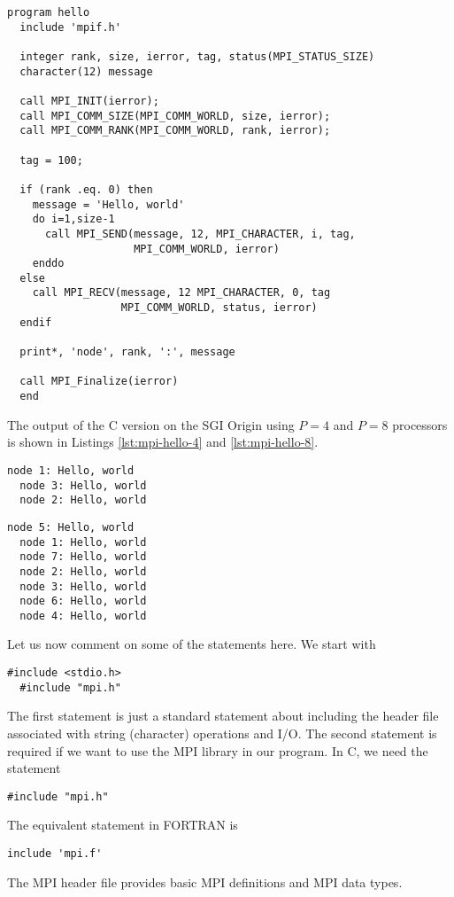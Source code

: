 \begin{lstlisting}[style=fortran, float, caption={Hello world MPI in FORTRAN.}, label=lst:mpi-hello-fortran]
  program hello
  include 'mpif.h'

  integer rank, size, ierror, tag, status(MPI_STATUS_SIZE)
  character(12) message

  call MPI_INIT(ierror);
  call MPI_COMM_SIZE(MPI_COMM_WORLD, size, ierror);
  call MPI_COMM_RANK(MPI_COMM_WORLD, rank, ierror);

  tag = 100;

  if (rank .eq. 0) then
    message = 'Hello, world'
    do i=1,size-1
      call MPI_SEND(message, 12, MPI_CHARACTER, i, tag,
                    MPI_COMM_WORLD, ierror)
    enddo
  else
    call MPI_RECV(message, 12 MPI_CHARACTER, 0, tag
                  MPI_COMM_WORLD, status, ierror)
  endif

  print*, 'node', rank, ':', message

  call MPI_Finalize(ierror)
  end
\end{lstlisting}

The output of the C version on the SGI Origin using $P=4$ and $P=8$ processors
is shown in Listings \ref{lst:mpi-hello-4} and \ref{lst:mpi-hello-8}.

\begin{lstlisting}[float, caption={Hello world MPI in C: $4$ processors.}, label=lst:mpi-hello-4]
  node 1: Hello, world
  node 3: Hello, world
  node 2: Hello, world
\end{lstlisting}

\begin{lstlisting}[float, caption={Hello world MPI in C: $8$ processors.}, label=lst:mpi-hello-4]
  node 5: Hello, world
  node 1: Hello, world
  node 7: Hello, world
  node 2: Hello, world
  node 3: Hello, world
  node 6: Hello, world
  node 4: Hello, world
\end{lstlisting}

Let us now comment on some of the statements here. We start with
\begin{lstlisting}[style=c]
  #include <stdio.h>
  #include "mpi.h"
\end{lstlisting}
The first statement is just a standard statement about including the header file
associated with string (character) operations and I/O. The second statement is
required if we want to use the MPI library in our program. In C, we need the
statement
\begin{lstlisting}[style=c]
  #include "mpi.h"
\end{lstlisting}
The equivalent statement in FORTRAN is
\begin{lstlisting}[style=fortran]
  include 'mpi.f'
\end{lstlisting}
The MPI header file provides basic MPI definitions and MPI data types.


